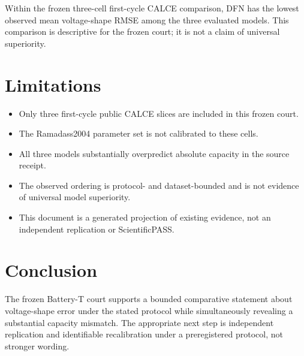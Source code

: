 \documentclass[11pt]{article}
\begin{document}
Within the frozen three-cell first-cycle CALCE comparison, DFN has the lowest observed mean voltage-shape RMSE among the three evaluated models. This comparison is descriptive for the frozen court; it is not a claim of universal superiority.

\section{Limitations}
\begin{itemize}
\item Only three first-cycle public CALCE slices are included in this frozen court.
\item The Ramadass2004 parameter set is not calibrated to these cells.
\item All three models substantially overpredict absolute capacity in the source receipt.
\item The observed ordering is protocol- and dataset-bounded and is not evidence of universal model superiority.
\item This document is a generated projection of existing evidence, not an independent replication or ScientificPASS.
\end{itemize}

\section{Conclusion}
The frozen Battery-T court supports a bounded comparative statement about voltage-shape error under the stated protocol while simultaneously revealing a substantial capacity mismatch. The appropriate next step is independent replication and identifiable recalibration under a preregistered protocol, not stronger wording.
\end{document}
